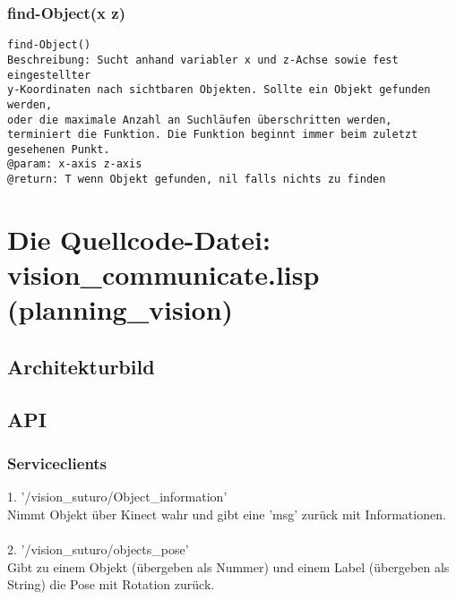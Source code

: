 \documentclass{suturo}
\begin{document}
\subsubsection{find-Object(x z)}
\begin{verbatim}
find-Object()
Beschreibung: Sucht anhand variabler x und z-Achse sowie fest eingestellter
y-Koordinaten nach sichtbaren Objekten. Sollte ein Objekt gefunden werden,
oder die maximale Anzahl an Suchläufen überschritten werden,
terminiert die Funktion. Die Funktion beginnt immer beim zuletzt gesehenen Punkt.
@param: x-axis z-axis
@return: T wenn Objekt gefunden, nil falls nichts zu finden
\end{verbatim}




\newpage
\section{Die Quellcode-Datei: vision\_communicate.lisp (planning\_vision)}

\subsection{Architekturbild}




\begin{figure}[!htb]
\end{figure}




\subsection{API}
\subsubsection{Serviceclients}
1. '/vision\_suturo/Object\_information' \\
Nimmt Objekt über Kinect wahr und gibt eine 'msg' zurück mit Informationen.\\ \\
2. '/vision\_suturo/objects\_pose' \\
Gibt zu einem Objekt (übergeben als Nummer) und einem Label (übergeben als String) die Pose mit Rotation zurück.
\end{document}
